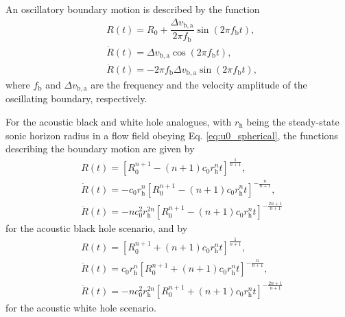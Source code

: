 An oscillatory boundary motion is described by the function
\begin{align}
& R\left(t\right) = R_0 + \dfrac{\Delta v_{\mathrm{b,a}}}{2\pi f_{\mathrm{b}}}\sin\left(2\pi f_{\mathrm{b}}t\right)
\label{eq:oscillatingBoundary_R}, \\[4pt]
& \dot R\left(t\right) = \Delta v_{\mathrm{b,a}}\cos\left(2\pi f_{\mathrm{b}}t\right)
\label{eq:oscillatingBoundary_dotR}, \\[4pt]
& \ddot R\left(t\right) = -2\pi f_{\mathrm{b}}\Delta v_{\mathrm{b,a}}\sin\left(2\pi f_{\mathrm{b}}t\right)
\label{eq:oscillatingBoundary_ddotR},
\end{align}
where $f_{\mathrm{b}}$ and $\Delta v_{\mathrm{b,a}}$ are the frequency and the velocity amplitude of the oscillating boundary, respectively. 

For the acoustic black and white hole analogues, with $r_{\mathrm{h}}$ being the steady-state sonic horizon radius in a flow field obeying Eq. \eqref{eq:u0_spherical}, the functions describing the boundary motion are given by
\begin{align}
& R\left(t\right) = \left[R_0^{n+1} - \left(n+1\right)c_0r_{\mathrm{h}}^nt\right]^{\frac{1}{n+1}},
\label{eq:R} \\[4pt]
& \dot R\left(t\right) = -c_0r_{\mathrm{h}}^n\left[R_0^{n+1} - \left(n+1\right)c_0r_{\mathrm{h}}^nt\right]^{-\frac{n}{n+1}},
\label{eq:Rdot} \\[4pt]
& \ddot R\left(t\right) = -nc_0^2r_{\mathrm{h}}^{2n}\left[R_0^{n+1} - \left(n+1\right)c_0r_{\mathrm{h}}^nt\right]^{-\frac{2n+1}{n+1}}
\label{eq:Rddot}
\end{align}
for the acoustic black hole scenario, and by
\begin{align}
& R\left(t\right) = \left[R_0^{n+1} + \left(n+1\right)c_0r_{\mathrm{h}}^nt\right]^{\frac{1}{n+1}},
\label{eq:R_WH} \\[4pt]
& \dot R\left(t\right) = c_0r_{\mathrm{h}}^n\left[R_0^{n+1} + \left(n+1\right)c_0r_{\mathrm{h}}^nt\right]^{-\frac{n}{n+1}},
\label{eq:Rdot_WH} \\[4pt]
& \ddot R\left(t\right) = -nc_0^2r_{\mathrm{h}}^{2n}\left[R_0^{n+1} + \left(n+1\right)c_0r_{\mathrm{h}}^nt\right]^{-\frac{2n+1}{n+1}}
\label{eq:Rddot_WH}
\end{align}
for the acoustic white hole scenario.

